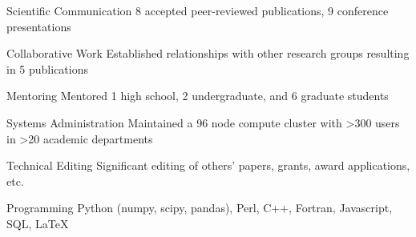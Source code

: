 


\begin{cvskills}


\cvskill
{Scientific Communication} %
{8 accepted peer-reviewed publications, 9 conference presentations} %


\cvskill
{Collaborative Work} %
{Established relationships with other research groups resulting in 5 publications} %


\cvskill
{Mentoring} %
{Mentored 1 high school, 2 undergraduate, and 6 graduate students} %


\cvskill
{Systems Administration} %
{Maintained a 96 node compute cluster with >300 users in >20 academic departments} %


\cvskill
{Technical Editing} %
{Significant editing of others' papers, grants, award applications, etc.} %


\cvskill
{Programming} %
{Python (numpy, scipy, pandas), Perl, C++, Fortran, Javascript, SQL, LaTeX} %


\end{cvskills}
